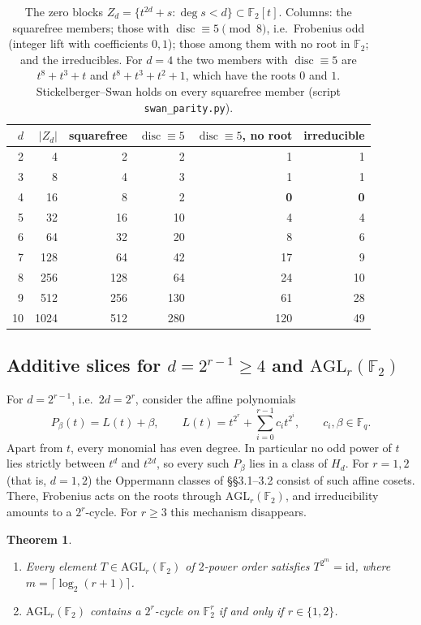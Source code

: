 \documentclass[11pt,a4paper]{amsart}
\newtheorem{theorem}{Theorem}[section]
\theoremstyle{definition}
\theoremstyle{remark}
\newcommand{\F}{\mathbb{F}}
\newcommand{\disc}{\operatorname{disc}}
\newcommand{\AGL}{\mathrm{AGL}}
\begin{document}
\begin{table}[!htbp]
\centering
\caption{The zero blocks $Z_d=\{t^{2d}+s:\deg s<d\}\subset\F_2[t]$. Columns: the squarefree members; those with
$\disc\equiv5\pmod8$, i.e.\ Frobenius odd (integer lift with coefficients $0,1$); those among them with no root in
$\F_2$; and the irreducibles. For $d=4$ the two members with $\disc\equiv5$ are $t^8+t^3+t$ and $t^8+t^3+t^2+1$,
which have the roots $0$ and $1$. Stickelberger--Swan holds on every squarefree member (script
\texttt{swan\_parity.py}).}\label{tab:zero}
\begin{tabular}{rrrrrr}
\toprule
$d$ & $|Z_d|$ & squarefree & $\disc\equiv5$ & $\disc\equiv5$, no root & irreducible\\
\midrule
2 & 4 & 2 & 2 & 1 & 1\\
3 & 8 & 4 & 3 & 1 & 1\\
4 & 16 & 8 & 2 & \textbf{0} & \textbf{0}\\
5 & 32 & 16 & 10 & 4 & 4\\
6 & 64 & 32 & 20 & 8 & 6\\
7 & 128 & 64 & 42 & 17 & 9\\
8 & 256 & 128 & 64 & 24 & 10\\
9 & 512 & 256 & 130 & 61 & 28\\
10 & 1024 & 512 & 280 & 120 & 49\\
\bottomrule
\end{tabular}
\end{table}


\subsection{\texorpdfstring{Additive slices for $d=2^{r-1}\ge4$ and $\AGL_r(\F_2)$}{Additive slices for d at least 4 and AGL(r,2)}}\label{subsec:additive}
For $d=2^{r-1}$, i.e.\ $2d=2^r$, consider the affine polynomials
\[
P_\beta(t)=L(t)+\beta,\qquad L(t)=t^{2^r}+\sum_{i=0}^{r-1}c_it^{2^i},\qquad c_i,\beta\in\F_q .
\]
Apart from $t$, every monomial has even degree. In particular no odd power of $t$ lies strictly between $t^d$ and
$t^{2d}$, so every such $P_\beta$ lies in a class of $H_d$. For $r=1,2$ (that is, $d=1,2$) the Oppermann classes of
\S\S3.1--3.2 consist of such affine cosets. There, Frobenius acts on the roots through $\mathrm{AGL}_r(\F_2)$, and
irreducibility amounts to a $2^r$-cycle. For $r\ge3$ this mechanism disappears.

\begin{theorem}\label{thm:agl}
\begin{enumerate}
\item Every element $T\in\mathrm{AGL}_r(\F_2)$ of $2$-power order satisfies $T^{2^m}=\mathrm{id}$, where
$m=\lceil\log_2(r+1)\rceil$.
\item $\mathrm{AGL}_r(\F_2)$ contains a $2^r$-cycle on $\F_2^r$ if and only if $r\in\{1,2\}$.
\end{enumerate}
\end{theorem}
\end{document}
